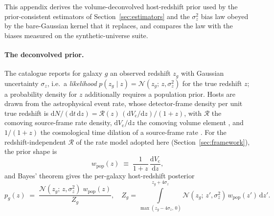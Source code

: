 This appendix derives the volume-deconvolved host-redshift prior used by the
prior-consistent estimators of Section~\ref{sec:estimators} and the
$\sigma_z^2$ bias law obeyed by the bare-Gaussian kernel that it replaces,
and compares the law with the biases measured on the synthetic-universe suite.

\paragraph*{The deconvolved prior.}
The catalogue reports for galaxy $g$ an observed redshift $z_g$ with Gaussian
uncertainty $\sigma_z$, i.e.\ a \emph{likelihood}
$p(z_g \mid z) = \mathcal{N}(z_g;\,z,\sigma_z^2)$ for the true redshift $z$; a
probability density for $z$ additionally requires a population prior. Hosts
are drawn from the astrophysical event rate, whose detector-frame density per
unit true redshift is
$\mathrm{d}N/(\mathrm{d}t\,\mathrm{d}z) =
\mathcal{R}(z)\,(\mathrm{d}V_\mathrm{c}/\mathrm{d}z)/(1+z)$, with $\mathcal{R}$ the
comoving source-frame rate density, $\mathrm{d}V_\mathrm{c}/\mathrm{d}z$ the comoving
volume element \citep{Hogg:1999ad}, and $1/(1+z)$ the cosmological time
dilation of a source-frame rate \citep{Mandel:2018mve,Babak:2017tow}. For the
redshift-independent $\mathcal{R}$ of the rate model adopted here
(Section~\ref{sec:framework}), the prior shape is
\begin{equation}
  w_\mathrm{pop}(z) \;\equiv\; \frac{1}{1+z}\,\frac{\mathrm{d}V_\mathrm{c}}{\mathrm{d}z} ,
  \label{eq:app:wpop}
\end{equation}
and Bayes' theorem gives the per-galaxy host-redshift posterior
\begin{equation}
  p_g(z) \;=\; \frac{\mathcal{N}(z_g;\,z,\sigma_z^2)\;w_\mathrm{pop}(z)}{Z_g},
  \quad
  Z_g = \!\!\int\limits_{\max(z_g - 4\sigma_z,\,0)}^{z_g + 4\sigma_z}\!\!
  \mathcal{N}(z_g;\,z',\sigma_z^2)\,w_\mathrm{pop}(z')\,\mathrm{d}z' .
  \label{eq:app:pgz}
\end{equation}
